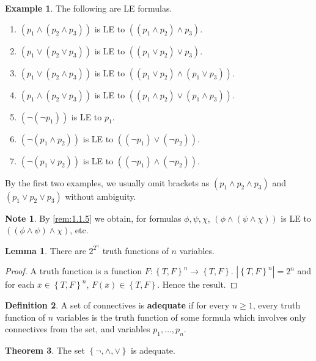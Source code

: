 \documentclass{article}
\newcommand{\rb}[1]{\left( #1 \right)}
\newcommand{\cb}[1]{\left\{ #1 \right\}}
\newcommand{\abs}[1]{\left\lvert #1 \right\rvert}
\newcommand{\notb}[1]{\rb{\neg #1}}
\newcommand{\orb}[2]{\rb{#1 \lor #2}}
\newcommand{\andb}[2]{\rb{#1 \land #2}}
\theoremstyle{definition}\newtheorem{definition}{Definition}[subsection]
\theoremstyle{definition}\newtheorem{remark}[definition]{Remark}
\theoremstyle{definition}\newtheorem*{example}{Example}
\theoremstyle{definition}\newtheorem*{note}{Note}
\newtheorem{lemma}[definition]{Lemma}
\newtheorem{theorem}[definition]{Theorem}
\begin{document}
\begin{example}
The following are LE formulas.
\begin{enumerate}
\item $ \andb{p_1}{\andb{p_2}{p_3}} $ is LE to $ \andb{\andb{p_1}{p_2}}{p_3} $.
\item $ \orb{p_1}{\orb{p_2}{p_3}} $ is LE to $ \orb{\orb{p_1}{p_2}}{p_3} $.
\item $ \orb{p_1}{\andb{p_2}{p_3}} $ is LE to $ \andb{\orb{p_1}{p_2}}{\orb{p_1}{p_3}} $.
\item $ \andb{p_1}{\orb{p_2}{p_3}} $ is LE to $ \orb{\andb{p_1}{p_2}}{\andb{p_1}{p_3}} $.
\item $ \notb{\notb{p_1}} $ is LE to $ p_1 $.
\item $ \notb{\andb{p_1}{p_2}} $ is LE to $ \orb{\notb{p_1}}{\notb{p_2}} $.
\item $ \notb{\orb{p_1}{p_2}} $ is LE to $ \andb{\notb{p_1}}{\notb{p_2}} $.
\end{enumerate}
By the first two examples, we usually omit brackets as $ \rb{p_1 \land p_2 \land p_3} $ and $ \rb{p_1 \lor p_2 \lor p_3} $ without ambiguity.
\end{example}

\begin{note}
By \ref{rem:1.1.5} we obtain, for formulas $ \phi, \psi, \chi $, $ \andb{\phi}{\andb{\psi}{\chi}} $ is LE to $ \andb{\andb{\phi}{\psi}}{\chi} $, etc.
\end{note}

\begin{lemma}
There are $ 2^{2^n} $ truth functions of $ n $ variables.
\end{lemma}

\begin{proof}
A truth function is a function $ F : \cb{T, F}^n \to \cb{T, F} $. $ \abs{\cb{T, F}^n} = 2^n $ and for each $ \overline{x} \in \cb{T, F}^n $, $ F\rb{\overline{x}} \in \cb{T, F} $. Hence the result.
\end{proof}

\begin{definition}
A set of connectives is \textbf{adequate} if for every $ n \ge 1 $, every truth function of $ n $ variables is the truth function of some formula which involves only connectives from the set, and variables $ p_1, \dots, p_n $.
\end{definition}

\begin{theorem}
\label{thm:1.1.9}
The set $ \cb{\neg, \land, \lor} $ is adequate.
\end{theorem}
\end{document}
